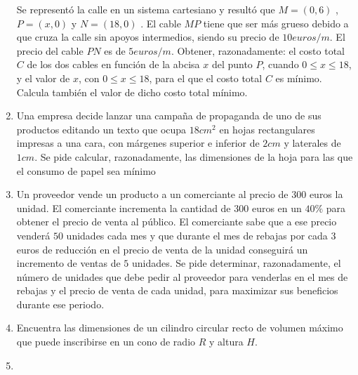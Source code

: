 \begin{enumerate}
Se representó la calle en un sistema cartesiano y resultó que $M 
= (0, 6)$ , $P = (x, 0)$ y $N = (18, 0)$ . El cable $MP$ tiene que ser más grueso debido a que cruza la calle sin apoyos 
intermedios, siendo su precio de $10 euros/m$. El precio del 
cable $PN$ es de $5 euros/m$. Obtener, razonadamente: el 
costo total $C$ de los dos cables en función de la abcisa $x$ del punto $P$, cuando $0 \le x \le 18$, y el valor de $x$, con $0\le x\le 18$, para el que el costo total $C$ es mínimo. Calcula también  el valor de dicho costo total mínimo. 

\rightline{\textcolor{gris}{Precio mínimo: $\; 141.96 $ euros}}

\item Una empresa decide lanzar una campaña de propaganda de uno de sus productos editando un texto que ocupa $18 cm^2$ en hojas rectangulares impresas a una cara, con márgenes superior e inferior de $2 cm$ y laterales de $1 cm$. Se pide calcular, razonadamente, las dimensiones de la hoja para las que el consumo de papel sea mínimo 

\rightline{\textcolor{gris}{Solución: El papel es mínimo para $5 cm ; \times ; 10cm$}}

\item Un proveedor vende un producto a un comerciante al precio de $300$ euros la unidad. El comerciante incrementa la cantidad de $300$ euros en un $40\%$ para obtener el precio de venta al público. El comerciante sabe que a ese precio 
	venderá $50$ unidades cada mes y que durante el mes de rebajas por cada $3$ euros de reducción en el precio de venta de la unidad conseguirá un incremento de ventas de $5$ unidades. Se pide determinar, razonadamente, el 
número de unidades que debe pedir al proveedor para venderlas en el mes de rebajas y el precio de venta de cada unidad, para maximizar sus beneficios durante ese periodo. 

\rightline{\textcolor{gris}{Solución: Debe pedir $125\; u$ y vender cada unidad a $375$ euros.}}

\item Encuentra las dimensiones de un cilindro circular recto de volumen máximo que puede inscribirse en un cono de radio $R$ y altura $H$.



\item 


\end{enumerate}
